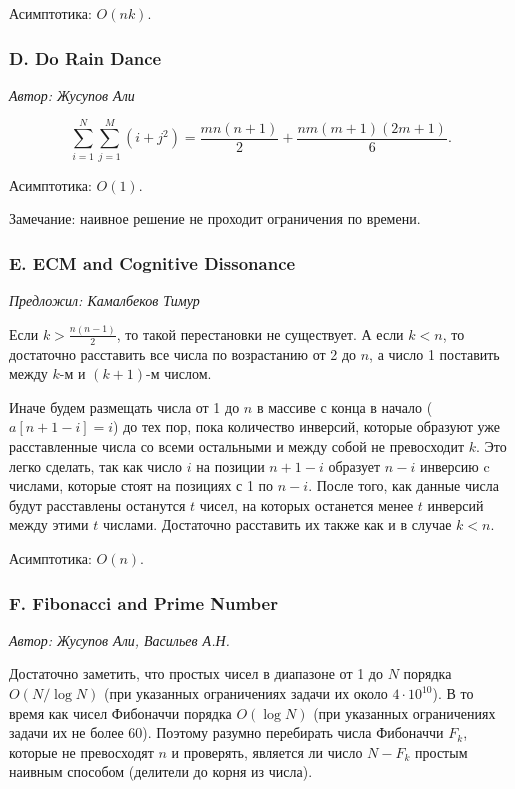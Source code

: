 \documentclass[10pt, a4paper]{article}
\newcommand{\problemauthor}[1]{
\begin{flushright}
\textit{Автор: #1}
\end{flushright}
}
\newcommand{\problemofferer}[1]{
\begin{flushright}
\textit{Предложил: #1}
\end{flushright}
}
\begin{document}
Асимптотика: $O(n k)$.



\subsubsection*{D. Do Rain Dance} 

\problemauthor{Жусупов Али}

$$\sum_{i=1}^{N} \sum_{j=1}^{M} (i + j^2) = \frac{m n (n+1)}{2} + \frac{n m (m+1) (2m+1)}{6}.$$

Асимптотика: $O(1)$.

Замечание: наивное решение не проходит ограничения по времени.



\subsubsection*{E. ECM and Cognitive Dissonance} 

\problemofferer{Камалбеков Тимур}

Если $k > \frac{n (n-1)}{2}$, то такой перестановки не существует. А если $k < n$, то достаточно расставить все числа по возрастанию от 2 до $n$, а число 1 поставить между $k$-м и $(k+1)$-м числом. 

Иначе будем размещать числа от 1 до $n$ в массиве с конца в начало ($a[n + 1 - i] = i$) до тех пор, пока количество инверсий, которые образуют уже расставленные числа со всеми остальными и между собой не превосходит $k$. Это легко сделать, так как число $i$ на позиции $n + 1 - i$ образует $n-i$ инверсию c числами, которые стоят на позициях с 1 по $n - i$. После того, как данные числа будут расставлены останутся $t$ чисел, на которых останется менее $t$ инверсий между этими $t$ числами. Достаточно расставить их также как и в случае $k < n$.

Асимптотика: $O(n)$.



\subsubsection*{F. Fibonacci and Prime Number} 

\problemauthor{Жусупов Али, Васильев А.Н.}

Достаточно заметить, что простых чисел в диапазоне от 1 до $N$ порядка $O(N / \log{N})$ (при указанных ограничениях задачи их около $4\cdot 10^{10}$). В то время как чисел Фибоначчи порядка $O(\log{N})$ (при указанных ограничениях задачи их не более 60). Поэтому разумно перебирать числа Фибоначчи $F_k$, которые не превосходят $n$ и проверять, является ли число $N - F_k$ простым наивным способом (делители до корня из числа).
\end{document}
